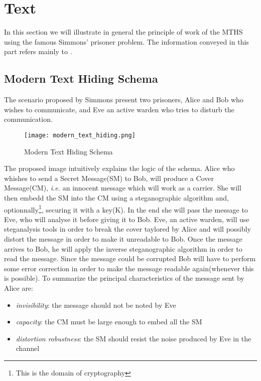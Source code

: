 \documentclass[../../main.tex]{subfiles}
\begin{document}
    
\section{Text}
In this section we will illustrate in general the principle of work of the
MTHS using the famous Simmons' prisoner problem.
The information conveyed in this part refers mainly to
\cite{modern-text-hiding}.

\subsection{Modern Text Hiding Schema}
The scenario proposed by Simmons present two prisoners, Alice and Bob who
wishes to communicate, and Eve an active warden who tries to disturb the
communication.

\begin{figure}[h]
    \centering
    \caption{Modern Text Hiding Schema}
    \texttt{[image: modern\_text\_hiding.png]}
\end{figure}

The proposed image intuitively explains the logic of the schema.
Alice who whishes to send a Secret Message(SM) to Bob, will produce a Cover
Message(CM), \emph{i.e.} an innocent message which will work as a carrier.
She will then embedd the SM into the CM using a steganographic algorithm
and, optionnally\footnote{This is the domain of cryptography}, securing it
with a key(K).
In the end she will pass the message to Eve, who will analyse it before
giving it to Bob.
Eve, an active warden, will use steganalysis tools in order to break the
cover taylored by Alice and will possibly distort the message in order to
make it unreadable to Bob.
Once the message arrives to Bob, he will apply the inverse steganographic
algorithm in order to read the message.
Since the message could be corrupted Bob will have to perform some error
correction in order to make the message readable again(whenever this is
possible).
To summarize the principal characteristics of the message sent by Alice
are:
\begin{itemize}[noitemsep]
    \item \emph{invisibility}: the message should not be noted by Eve
    \item \emph{capacity}: the CM must be large enough to embed all the SM
    \item \emph{distortion robustness}: the SM should resist the noise
        produced by Eve in the channel
\end{itemize}
\end{document}
